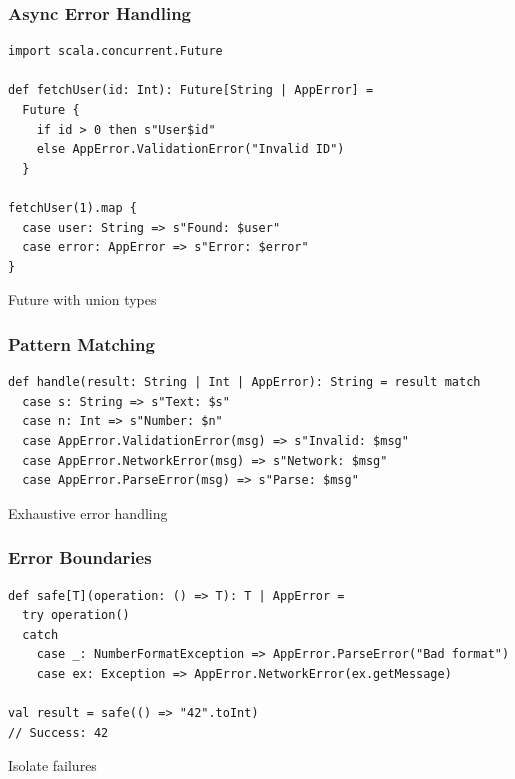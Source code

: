\documentclass{beamer}
\begin{document}
\begin{frame}[fragile]
\frametitle{Async Error Handling}

\begin{lstlisting}[style=scalaStyle]
import scala.concurrent.Future

def fetchUser(id: Int): Future[String | AppError] = 
  Future {
    if id > 0 then s"User$id"
    else AppError.ValidationError("Invalid ID")
  }

fetchUser(1).map {
  case user: String => s"Found: $user"
  case error: AppError => s"Error: $error"
}
\end{lstlisting}

Future with union types

\end{frame}

\begin{frame}[fragile]
\frametitle{Pattern Matching}

\begin{lstlisting}[style=scalaStyle]
def handle(result: String | Int | AppError): String = result match
  case s: String => s"Text: $s"
  case n: Int => s"Number: $n"
  case AppError.ValidationError(msg) => s"Invalid: $msg"
  case AppError.NetworkError(msg) => s"Network: $msg"
  case AppError.ParseError(msg) => s"Parse: $msg"
\end{lstlisting}

Exhaustive error handling

\end{frame}

\begin{frame}[fragile]
\frametitle{Error Boundaries}

\begin{lstlisting}[style=scalaStyle]
def safe[T](operation: () => T): T | AppError =
  try operation()
  catch 
    case _: NumberFormatException => AppError.ParseError("Bad format")
    case ex: Exception => AppError.NetworkError(ex.getMessage)

val result = safe(() => "42".toInt)
// Success: 42
\end{lstlisting}

Isolate failures

\end{frame}
\end{document}
